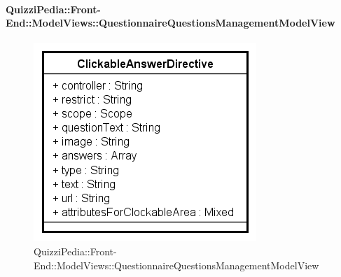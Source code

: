 					\paragraph{QuizziPedia::Front-End::ModelViews::QuestionnaireQuestionsManagementModelView}
					
					\label{QuizziPedia::Front-End::ModelViews::QuestionnaireQuestionsManagementModelView}
					
					\begin{figure}[ht]
						\centering
						\includegraphics[scale=0.5,keepaspectratio]{UML/Classi/Front-End/QuizziPedia_Front-end_Templates_ClickableAnswerTemplate.png}
						\caption{QuizziPedia::Front-End::ModelViews::QuestionnaireQuestionsManagementModelView}
					\end{figure} \FloatBarrier
					
